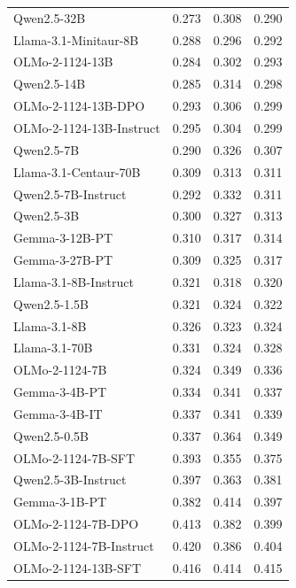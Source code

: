 \documentclass{article} %
\begin{document}
\begin{table}[!ht]
\begin{tabular}{l|cc|c}
Qwen2.5-32B & 0.273 & 0.308 & 0.290 \\
\rowcolor[HTML]{EFEFEF}
Llama-3.1-Minitaur-8B & 0.288 & 0.296 & 0.292 \\
OLMo-2-1124-13B & 0.284 & 0.302 & 0.293 \\
\rowcolor[HTML]{EFEFEF}
Qwen2.5-14B & 0.285 & 0.314 & 0.298 \\
OLMo-2-1124-13B-DPO & 0.293 & 0.306 & 0.299 \\
\rowcolor[HTML]{EFEFEF}
OLMo-2-1124-13B-Instruct & 0.295 & 0.304 & 0.299 \\
Qwen2.5-7B & 0.290 & 0.326 & 0.307 \\
\rowcolor[HTML]{EFEFEF}
Llama-3.1-Centaur-70B & 0.309 & 0.313 & 0.311 \\
Qwen2.5-7B-Instruct & 0.292 & 0.332 & 0.311 \\
\rowcolor[HTML]{EFEFEF}
Qwen2.5-3B & 0.300 & 0.327 & 0.313 \\
Gemma-3-12B-PT & 0.310 & 0.317 & 0.314 \\
\rowcolor[HTML]{EFEFEF}
Gemma-3-27B-PT & 0.309 & 0.325 & 0.317 \\
Llama-3.1-8B-Instruct & 0.321 & 0.318 & 0.320 \\
\rowcolor[HTML]{EFEFEF}
Qwen2.5-1.5B & 0.321 & 0.324 & 0.322 \\
Llama-3.1-8B & 0.326 & 0.323 & 0.324 \\
\rowcolor[HTML]{EFEFEF}
Llama-3.1-70B & 0.331 & 0.324 & 0.328 \\
OLMo-2-1124-7B & 0.324 & 0.349 & 0.336 \\
\rowcolor[HTML]{EFEFEF}
Gemma-3-4B-PT & 0.334 & 0.341 & 0.337 \\
Gemma-3-4B-IT & 0.337 & 0.341 & 0.339 \\
\rowcolor[HTML]{EFEFEF}
Qwen2.5-0.5B & 0.337 & 0.364 & 0.349 \\
OLMo-2-1124-7B-SFT & 0.393 & 0.355 & 0.375 \\
\rowcolor[HTML]{EFEFEF}
Qwen2.5-3B-Instruct & 0.397 & 0.363 & 0.381 \\
Gemma-3-1B-PT & 0.382 & 0.414 & 0.397 \\
\rowcolor[HTML]{EFEFEF}
OLMo-2-1124-7B-DPO & 0.413 & 0.382 & 0.399 \\
OLMo-2-1124-7B-Instruct & 0.420 & 0.386 & 0.404 \\
\rowcolor[HTML]{EFEFEF}
OLMo-2-1124-13B-SFT & 0.416 & 0.414 & 0.415 \\
\bottomrule
\end{tabular}
\end{table}
\end{document}

